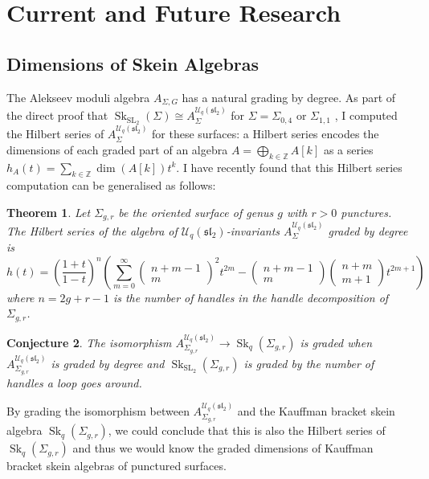 \documentclass{article}
\newcommand{\Sk}{\operatorname{Sk}}
\newcommand{\SL}{\operatorname{SL}}
\newcommand{\slgroup}{\mathfrak{sl}}
\newtheorem{thm}{Theorem}
\newtheorem{conj}[thm]{Conjecture}
\begin{document}
\section{Current and Future Research}

\subsection{Dimensions of Skein Algebras}
\label{sec:dimensions}

The Alekseev moduli algebra $A_{\Sigma, G}$ has a natural grading by degree. As part of the direct proof that $\Sk_{\SL_2}(\Sigma) \cong A_{\Sigma}^{\mathcal{U}_q(\slgroup_2)}$ for $\Sigma = \Sigma_{0,4}$ or $\Sigma_{1,1}$ \cite{C1}, I computed the Hilbert series of  $A_{\Sigma}^{\mathcal{U}_q(\slgroup_2)}$ for these surfaces: a Hilbert series encodes the dimensions of each graded part of an algebra $A = \bigoplus_{k \in \mathbb{Z}} A[k]$ as a series $h_A(t) = \sum_{k \in \mathbb{Z}} \dim(A[k]) t^k$.
I have recently found that this Hilbert series computation can be generalised as follows:
\begin{thm}
Let $\Sigma_{g,r}$ be the oriented surface of genus $g$ with $r>0$ punctures. The Hilbert series of the algebra of $\mathcal{U}_q(\slgroup_2)$-invariants $A_{\Sigma}^{\mathcal{U}_q(\slgroup_2)}$ graded by degree is 
\[
h(t) = \left(\frac{1+t}{1-t}\right)^n \left(\sum_{m=0}^{\infty} \begin{pmatrix}n+m-1 \\ m \end{pmatrix}^2 t^{2m} - \begin{pmatrix} n+m-1 \\ m\end{pmatrix} \begin{pmatrix} n+m \\ m+1\end{pmatrix} t^{2m+1}\right)
\]
where $n = 2g+r-1$ is the number of handles in the handle decomposition of $\Sigma_{g,r}$. 
\end{thm}
\begin{conj}
\label{conj:grading}
The isomorphism $A_{\Sigma_{g,r}}^{\mathcal{U}_q(\slgroup_2)} \to \Sk_q(\Sigma_{g,r})$ is graded when $A_{\Sigma_{g,r}}^{\mathcal{U}_q(\slgroup_2)}$ is graded by degree and $\Sk_{\SL_2}(\Sigma_{g,r})$ is graded by the number of handles a loop goes around. 
\end{conj}
By grading the isomorphism between $A_{\Sigma_{g,r}}^{\mathcal{U}_q(\slgroup_2)}$ and the Kauffman bracket skein algebra $\Sk_{q}(\Sigma_{g,r})$, we could conclude that this is also the Hilbert series of $\Sk_{q}(\Sigma_{g,r})$ and thus we would know the graded dimensions of Kauffman bracket skein algebras of punctured surfaces. 
\end{document}
